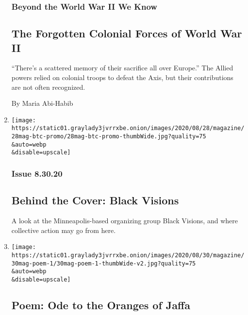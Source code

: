 \begin{enumerate}
  \hypertarget{beyond-the-world-war-ii-we-know-3}{%
  \subsubsection{Beyond the World War II We
  Know}\label{beyond-the-world-war-ii-we-know-3}}

  \hypertarget{the-forgotten-colonial-forces-of-world-war-ii}{%
  \subsection{The Forgotten Colonial Forces of World War
  II}\label{the-forgotten-colonial-forces-of-world-war-ii}}

  ``There's a scattered memory of their sacrifice all over Europe.'' The
  Allied powers relied on colonial troops to defeat the Axis, but their
  contributions are not often recognized.

  By Maria Abi-Habib
\item
  \href{/2020/08/28/magazine/behind-the-cover-black-visions.html}{}

  \texttt{[image: https://static01.graylady3jvrrxbe.onion/images/2020/08/28/magazine/28mag-btc-promo/28mag-btc-promo-thumbWide.jpg?quality=75\\\&auto=webp\\\&disable=upscale]}

  \hypertarget{issue-83020}{%
  \subsubsection{Issue 8.30.20}\label{issue-83020}}

  \hypertarget{behind-the-cover-black-visions}{%
  \subsection{Behind the Cover: Black
  Visions}\label{behind-the-cover-black-visions}}

  A look at the Minneapolis-based organizing group Black Visions, and
  where collective action may go from here.
\item
  \href{/2020/08/27/magazine/poem-ode-to-the-oranges-of-jaffa.html}{}

  \texttt{[image: https://static01.graylady3jvrrxbe.onion/images/2020/08/30/magazine/30mag-poem-1/30mag-poem-1-thumbWide-v2.jpg?quality=75\\\&auto=webp\\\&disable=upscale]}

  \hypertarget{poem-ode-to-the-oranges-of-jaffa}{%
  \subsection{Poem: Ode to the Oranges of
  Jaffa}\label{poem-ode-to-the-oranges-of-jaffa}}


\end{enumerate}
